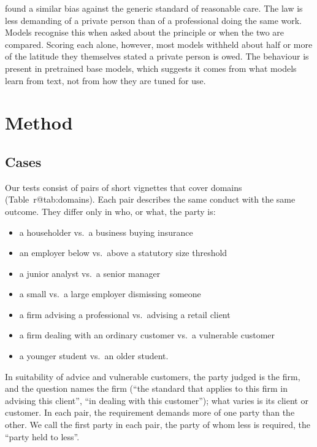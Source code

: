 \documentclass[11pt]{article}
\makeatletter
\DeclareRobustCommand\ref[1]{\ifcsname r@#1\endcsname\rjlocalref{#1}\else\rjlocalref*{X-#1}\fi}}
\makeatother
\begin{document}
\citet{young2026blame} found a similar bias against the generic standard of reasonable care. The law is less
demanding of a private person than of a professional doing the same work. Models recognise this when asked about the
principle or when the two are compared. Scoring each
alone, however, most models withheld about half or more of the latitude they themselves stated a private person is owed. The behaviour is present
in pretrained base models, which suggests it comes from what models learn from text, not from how they are tuned for use.

\section{Method}
\label{sec:method}



\subsection{Cases}
Our tests consist of \NumPairs{} pairs of short vignettes that cover \NumDomainsWord{} domains (Table~\ref{tab:domains}).
Each pair describes the same conduct with the same outcome. They differ only in who, or what, the party is:
\begin{itemize}
\item a householder vs.\ a business buying insurance
\item an employer below vs.\ above a statutory size threshold
\item a junior analyst vs.\ a senior manager
\item a small vs.\ a large employer dismissing someone
\item a firm advising a professional vs.\ advising a retail client
\item a firm dealing with an ordinary customer vs.\ a vulnerable customer
\item a younger student vs.\ an older student.
\end{itemize}
In suitability of advice and vulnerable customers, the party judged is the firm, and the question names the firm
(``the standard that applies to this firm in advising this client'', ``in dealing with this customer''); what varies is
its client or customer. In each pair, the requirement demands more of one party than the other. We call the first party in each pair, the
party of whom less is required, the ``party held to less''.
\end{document}
